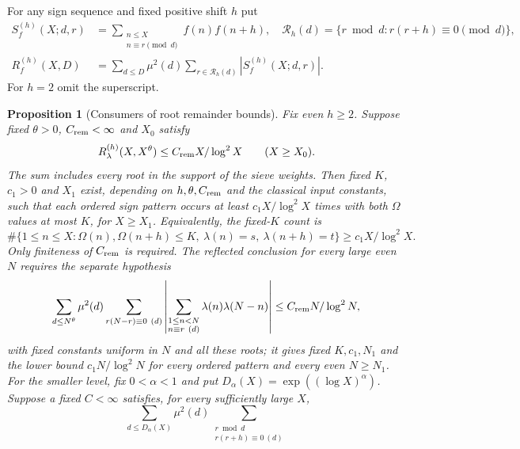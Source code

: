 \documentclass[11pt]{article}
\newtheorem{proposition}[theorem]{Proposition}
\theoremstyle{definition}
\theoremstyle{remark}
\numberwithin{equation}{section}
\begin{document}
For any sign sequence and fixed positive shift $h$ put
\begin{equation}\label{eq:root-def}
\begin{aligned}
 S_f^{(h)}(X;d,r)&=\sum_{\substack{n\le X\\n\equiv r\pmod d}}f(n)f(n+h),\quad
 \mathcal R_h(d)=\{r\bmod d:r(r+h)\equiv0\pmod d\},\\
 R_f^{(h)}(X,D)&=\sum_{d\le D}\mu^2(d)\sum_{r\in\mathcal R_h(d)}|S_f^{(h)}(X;d,r)|.
\end{aligned}
\end{equation}
For $h=2$ omit the superscript.
\begin{proposition}[Consumers of root remainder bounds]\label{prop:consumer}
Fix even $h\ge2$. Suppose fixed $\theta>0$, $C_{\rm rem}<\infty$ and $X_0$ satisfy
\begin{equation}\label{eq:root-hyp}
 R_\lambda^{(h)}(X,X^\theta)\le C_{\rm rem}X/\log^2X\qquad(X\ge X_0).
\end{equation}
The sum includes every root in the support of the sieve weights. Then fixed $K$, $c_1>0$ and $X_1$
exist, depending on $h,\theta,C_{\rm rem}$ and the classical input constants, such that each ordered
sign pattern occurs at least $c_1X/\log^2X$ times with both $\Omega$ values at most $K$, for $X\ge X_1$.
Equivalently, the fixed-$K$ count is
\begin{equation}\label{eq:a-consumer-count}
 \#\{1\le n\le X:\Omega(n),\Omega(n+h)\le K,\ \lambda(n)=s,\ \lambda(n+h)=t\}
 \ge c_1X/\log^2X.
\end{equation}
Only finiteness of $C_{\rm rem}$ is required.
The reflected conclusion for every large even $N$ requires the separate hypothesis
\begin{equation}\label{eq:root-reflected-hyp}
 \sum_{d\le N^\theta}\mu^2(d)\sum_{r(N-r)\equiv0\ (d)}
 \left|\sum_{\substack{1\le n<N\\n\equiv r\ (d)}}\lambda(n)\lambda(N-n)\right|
 \le C_{\rm rem}N/\log^2N,
\end{equation}
with fixed constants uniform in $N$ and all these roots; it gives fixed $K,c_1,N_1$ and the lower bound
$c_1N/\log^2N$ for every ordered pattern and every even $N\ge N_1$.
For the smaller level, fix $0<\alpha<1$ and put $D_\alpha(X)=\exp((\log X)^\alpha)$.
Suppose a fixed $C<\infty$ satisfies, for every sufficiently large $X$,
\begin{equation}\label{eq:root-subpower-hyp}
 \sum_{d\le D_\alpha(X)}\mu^2(d)
 \sum_{\substack{r\bmod d\\r(r+h)\equiv0\ (d)}}

\end{equation}
\end{proposition}
\end{document}
